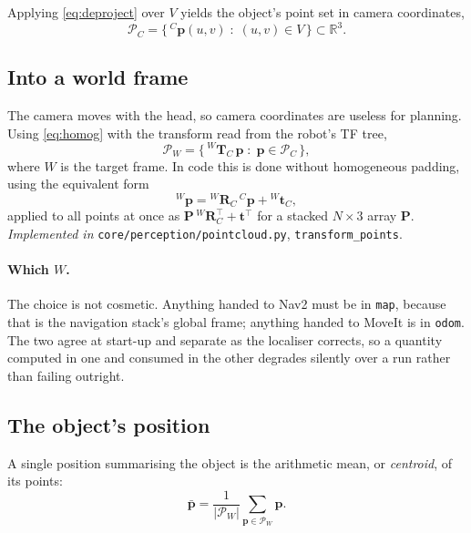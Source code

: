 \documentclass[11pt,a4paper]{article}
\newcommand{\Reals}{\mathbb{R}}
\newcommand{\Tf}[2]{{}^{#1}\mathbf{T}_{#2}}
\newcommand{\Rot}[2]{{}^{#1}\mathbf{R}_{#2}}
\begin{document}
Applying \eqref{eq:deproject} over $V$ yields the object's point set in camera
coordinates,
\begin{equation}
\mathcal{P}_C = \{\, {}^{C}\mathbf{p}(u,v) \;:\; (u,v) \in V \,\} \subset \Reals^3 .
\end{equation}

\subsection{Into a world frame}
\label{sec:frames}

The camera moves with the head, so camera coordinates are useless for planning.
Using \eqref{eq:homog} with the transform read from the robot's TF tree,
\begin{equation}
\mathcal{P}_W = \{\, \Tf{W}{C}\, \mathbf{p} \;:\; \mathbf{p} \in \mathcal{P}_C \,\},
\end{equation}
where $W$ is the target frame. In code this is done without homogeneous padding,
using the equivalent form
\begin{equation}
{}^{W}\mathbf{p} = \Rot{W}{C}\, {}^{C}\mathbf{p} + {}^{W}\mathbf{t}_{C},
\end{equation}
applied to all points at once as $\mathbf{P}\,\Rot{W}{C}^\top + \mathbf{t}^\top$
for a stacked $N \times 3$ array $\mathbf{P}$.
\textit{Implemented in} \texttt{core/perception/pointcloud.py}, \texttt{transform\_points}.

\paragraph{Which $W$.} The choice is not cosmetic. Anything handed to Nav2 must be
in \texttt{map}, because that is the navigation stack's global frame; anything
handed to MoveIt is in \texttt{odom}. The two agree at start-up and separate as
the localiser corrects, so a quantity computed in one and consumed in the other
degrades silently over a run rather than failing outright.

\subsection{The object's position}

A single position summarising the object is the arithmetic mean, or
\emph{centroid}, of its points:
\begin{equation}
\boxed{\;
\bar{\mathbf{p}} = \frac{1}{|\mathcal{P}_W|} \sum_{\mathbf{p} \in \mathcal{P}_W} \mathbf{p}.
\;}
\label{eq:centroid}
\end{equation}
\end{document}
